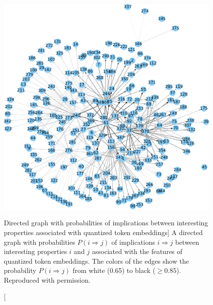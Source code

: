 \begin{figure}
\includegraphics{word2bits-implications}
\vspace{-0.5cm}
\caption
  [Directed graph with probabilities of implications between interesting
   properties associated with quantized token embeddings]%
  {A directed graph with probabilities $P(i ⇒ j)$ of implications $i ⇒ j$
   between interesting properties $i$ and $j$ associated with the features
   of quantized token embeddings. The colors of the edges show the probability
   $P(i ⇒ j)$ from white (0.65) to black ($≥ 0.85$).
   Reproduced with permission. \cite[Figure B.1]{stefanik2019semantic}}
\protect{}
\label{fig:formal-concept-analysis-with-quantized-token-embeddings}
\end{figure}
